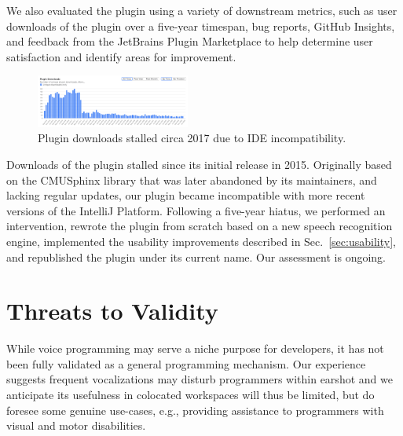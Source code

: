 \documentclass[conference]{IEEEtran}
\begin{document}
We also evaluated the plugin using a variety of downstream metrics, such as user downloads of the plugin over a five-year timespan, bug reports, GitHub Insights, and feedback from the JetBrains Plugin Marketplace to help determine user satisfaction and identify areas for improvement.

\begin{figure}[ht!]
    \centering
    \includegraphics[width=0.45\textwidth]{downloads.png}
    \caption{Plugin downloads stalled circa 2017 due to IDE incompatibility.}
\end{figure}

Downloads of the plugin stalled since its initial release in 2015. Originally based on the CMUSphinx library that was later abandoned by its maintainers, and lacking regular updates, our plugin became incompatible with more recent versions of the IntelliJ Platform. Following a five-year hiatus, we performed an intervention, rewrote the plugin from scratch based on a new speech recognition engine, implemented the usability improvements described in Sec.~\ref{sec:usability}, and republished the plugin under its current name. Our assessment is ongoing.



\section{Threats to Validity}

While voice programming may serve a niche purpose for developers, it has not been fully validated as a general programming mechanism. Our experience suggests frequent vocalizations may disturb programmers within earshot and we anticipate its usefulness in colocated workspaces will thus be limited, but do foresee some genuine use-cases, e.g., providing assistance to programmers with visual and motor disabilities.
\end{document}
